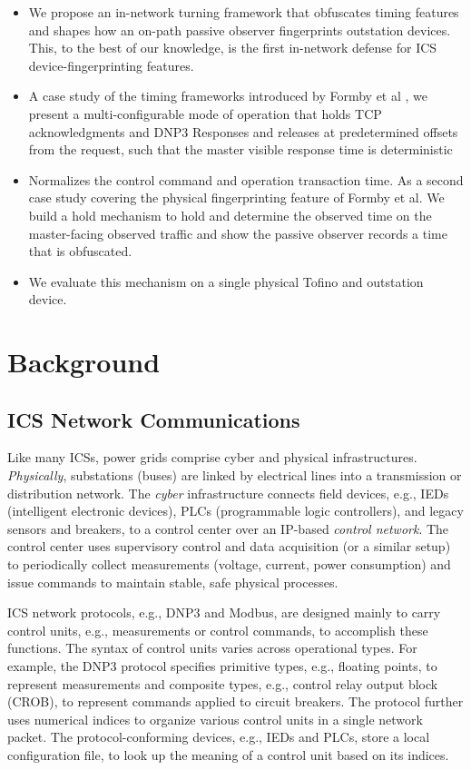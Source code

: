 \documentclass[conference]{IEEEtran}
\begin{document}
\begin{itemize}
    \item We propose an in-network turning framework that obfuscates timing features and shapes how an on-path passive observer fingerprints outstation devices. This, to the best of our knowledge, is the first in-network defense for ICS device-fingerprinting features. 
    \item A case study of the timing frameworks introduced by Formby et al \cite{formby2016}, we present a multi-configurable mode of operation that holds TCP acknowledgments and DNP3 Responses and releases at predetermined offsets from the request, such that the master visible response time is deterministic
    \item Normalizes the control command and operation transaction time. As a second case study covering the physical fingerprinting feature of Formby et al. We build a hold mechanism  to hold and determine the observed time on the master-facing observed traffic and show the passive observer records a time that is obfuscated. 
    \item We evaluate this mechanism on a single physical Tofino  and outstation device.
    
\end{itemize}

\section{Background}

\subsection{ICS Network Communications}
Like many ICSs, power grids comprise cyber and physical infrastructures. \textit{Physically}, substations (buses) are linked by electrical lines into a transmission or distribution network. The \textit{cyber} infrastructure connects field devices, e.g., IEDs (intelligent electronic devices), PLCs (programmable logic controllers), and legacy sensors and breakers, to a control center over an IP-based \textit{control network}. The control center uses supervisory control and data acquisition (or a similar setup) to periodically collect measurements (voltage, current, power consumption) and issue commands to maintain stable, safe physical processes.

ICS network protocols, e.g., DNP3 and Modbus, are designed mainly to carry control units, e.g., measurements or control commands, to accomplish these functions. The syntax of control units varies across operational types. For example, the DNP3 protocol specifies primitive types, e.g., floating points, to represent measurements and composite types, e.g., control relay output block (CROB), to represent commands applied to circuit breakers. The protocol further uses numerical indices to organize various control units in a single network packet. The protocol-conforming devices, e.g., IEDs and PLCs, store a local configuration file, to look up the meaning of a control unit based on its indices.
\end{document}

